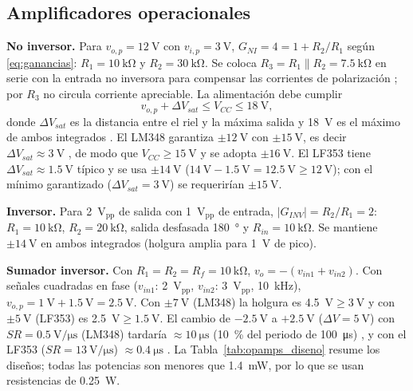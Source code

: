 \documentclass[9pt, conference]{IEEEtran}
\newcommand{\qV}[1]{\SI{#1}{\volt}}
\newcommand{\qkohm}[1]{\SI{#1}{\kilo\ohm}}
\newcommand{\qmW}[1]{\SI{#1}{\milli\watt}}
\newcommand{\qW}[1]{\SI{#1}{\watt}}
\newcommand{\qVpp}[1]{\SI{#1}{\volt}$_{\mathrm{pp}}$}
\newcommand{\pct}[1]{\SI{#1}{\percent}}
\begin{document}
\subsection{Amplificadores operacionales}
\textbf{No inversor.} Para $v_{o,p}=\qV{12}$ con $v_{i,p}=\qV{3}$, $G_{NI}=4=1+R_2/R_1$ según \eqref{eq:ganancias}: $R_1=\qkohm{10}$ y $R_2=\qkohm{30}$. Se coloca $R_3=R_1\parallel R_2=\qkohm{7.5}$ en serie con la entrada no inversora para compensar las corrientes de polarización \cite{sedra}; por $R_3$ no circula corriente apreciable. La alimentación debe cumplir
\begin{equation}
v_{o,p}+\Delta V_{sat}\le V_{CC}\le\qV{18},
\label{eq:vcc}
\end{equation}
donde $\Delta V_{sat}$ es la distancia entre el riel y la máxima salida y \qV{18} es el máximo de ambos integrados \cite{lm348,lf353}. El LM348 garantiza $\pm\qV{12}$ con $\pm\qV{15}$, es decir $\Delta V_{sat}\approx\qV{3}$ \cite{lm348}, de modo que $V_{CC}\ge\qV{15}$ y se adopta $\pm\qV{16}$. El LF353 tiene $\Delta V_{sat}\approx\qV{1.5}$ típico \cite{lf353} y se usa $\pm\qV{14}$ ($\qV{14}-\qV{1.5}=\qV{12.5}\ge\qV{12}$); con el mínimo garantizado ($\Delta V_{sat}=\qV{3}$) se requerirían $\pm\qV{15}$.

\textbf{Inversor.} Para \qVpp{2} de salida con \qVpp{1} de entrada, $|G_{INV}|=R_2/R_1=2$: $R_1=\qkohm{10}$, $R_2=\qkohm{20}$, salida desfasada \SI{180}{\degree} y $R_{in}=\qkohm{10}$. Se mantiene $\pm\qV{14}$ en ambos integrados (holgura amplia para \qV{1} de pico).

\textbf{Sumador inversor.}\label{sec:sumador} Con $R_1=R_2=R_f=\qkohm{10}$, $v_o=-(v_{in1}+v_{in2})$. Con señales cuadradas en fase ($v_{in1}$: \qVpp{2}, $v_{in2}$: \qVpp{3}, \SI{10}{\kilo\hertz}), $v_{o,p}=\qV{1}+\qV{1.5}=\qV{2.5}$. Con $\pm\qV{7}$ (LM348) la holgura es \qV{4.5}$\ge\qV{3}$ y con $\pm\qV{5}$ (LF353) es \qV{2.5}$\ge\qV{1.5}$. El cambio de $-\qV{2.5}$ a $+\qV{2.5}$ ($\Delta V=\qV{5}$) con $SR=\SI{0.5}{\volt\per\micro\second}$ (LM348) tardaría $\approx\SI{10}{\micro\second}$ (\pct{10} del periodo de \SI{100}{\micro\second}) \cite{lm348}, y con el LF353 ($SR=\SI{13}{\volt\per\micro\second}$) $\approx\SI{0.4}{\micro\second}$ \cite{lf353}. La Tabla~\ref{tab:opamps_diseno} resume los diseños; todas las potencias son menores que \qmW{1.4}, por lo que se usan resistencias de \qW{0.25}.
\end{document}
